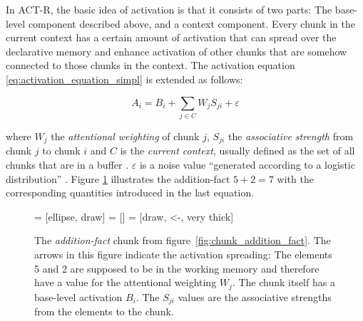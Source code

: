 In ACT-R, the basic idea of activation is that it consists of two parts: The base-level component described above, and a context component. Every chunk in the current context has a certain amount of activation that can spread over the declarative memory and enhance activation of other chunks that are somehow connected to those chunks in the context. The activation equation \eqref{eq:activation_equation_simpl} is extended as follows:

\begin{equation}
\label{eq:activation_equation}
 A_i = B_i + \sum_{j \in C}{W_j S_{ji}} + \varepsilon
\end{equation}

where $W_j$ the \emph{attentional weighting} of chunk $j$, $S_{ji}$ the \emph{associative strength} from chunk $j$ to chunk $i$ and $C$ is the \emph{current context}\label{current_context}, usually defined as the set of all chunks that are in a buffer \cites[1042]{anderson_integrated_2004}[33]{taatgen_modeling_2006}[unit 5]{actr_tutorial}. $\varepsilon$ is a noise value ``generated according to a logistic distribution'' \cite[unit 4, p. 4]{actr_tutorial}. Figure \ref{fig:chunk_activation} illustrates the addition-fact $5 + 2 = 7$ with the corresponding quantities introduced in the last equation. 

\begin{figure}[htb]
\centering
{} = [ellipse, draw]
 = [] 
 = [draw, <-, very thick]   

\caption{The \emph{addition-fact} chunk from figure~\ref{fig:chunk_addition_fact}. The arrows in this figure indicate the activation spreading: The elements 5 and 2 are supposed to be in the working memory and therefore have a value for the attentional weighting $W_j$. The chunk itself has a base-level activation $B_i$. The $S_{ji}$ values are the associative strengths from the elements to the chunk. \cite[fig.~5]{anderson_integrated_2004}}
\label{fig:chunk_activation}
\end{figure}

